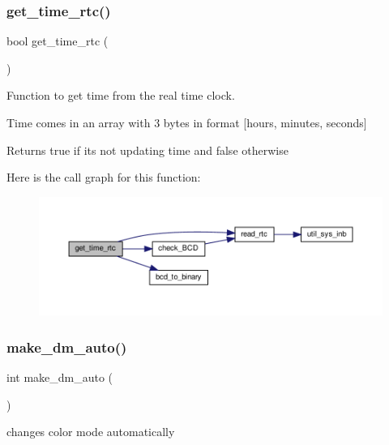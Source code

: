 \subsubsection{\texorpdfstring{get\+\_\+time\+\_\+rtc()}{get\_time\_rtc()}}
{\footnotesize\ttfamily bool get\+\_\+time\+\_\+rtc (\begin{DoxyParamCaption}{ }\end{DoxyParamCaption})}



Function to get time from the real time clock. 

Time comes in an array with 3 bytes in format \mbox{[}hours, minutes, seconds\mbox{]} \begin{DoxyReturn}{Returns}
true if it\textquotesingle{}s not updating time and false otherwise 
\end{DoxyReturn}
Here is the call graph for this function\+:\nopagebreak
\begin{figure}[H]
\begin{center}
\leavevmode
\includegraphics[width=350pt]{group__RealTimeClock_ga18fb6b60ca3519b4c5943902893f89eb_cgraph}
\end{center}
\end{figure}
\mbox{\label{group__RealTimeClock_ga7e3748780d4ab4b2f87949e477dba28c}} 
\subsubsection{\texorpdfstring{make\+\_\+dm\+\_\+auto()}{make\_dm\_auto()}}
{\footnotesize\ttfamily int make\+\_\+dm\+\_\+auto (\begin{DoxyParamCaption}{ }\end{DoxyParamCaption})}



changes color mode automatically 

